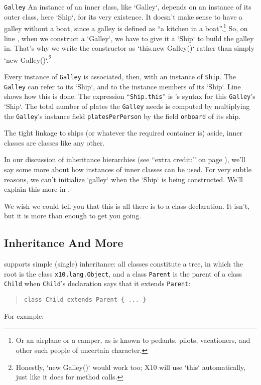\begin{description}
\begin{finepoint} {\tt Galley}
An instance of an inner class, like \xcd`Galley`, depends on an instance of
its outer class, here \xcd`Ship`, for its very existence.  It doesn't make
sense to have a galley without a boat, since a galley is defined as ``a
kitchen in a boat''.\footnote{Or an airplane or a camper, as is known to
pedants, pilots, vacationers, and other such people of uncertain character.}   
So, on line , when we construct a \xcd`Galley`, we
have to give it a \xcd`Ship` to build the galley in. That's why we write the
constructor as \xcd`this.new Galley()` rather than simply 
\xcd`new Galley()`.\footnote{Honestly, \xcd`new Galley()` would work too; X10
will use 
\xcd`this` automatically, just like it does for method calls.}


Every instance of {\tt Galley} is associated, then, with an instance of
{\tt Ship}.  
The {\tt Galley} can refer to its \xcd`Ship`, and to the 
instance members of its \xcd`Ship`.  Line  shows how
this is done. 
The expression ``{\tt Ship.this}'' is \Xten's syntax
for this {\tt Galley}'s \xcd`Ship`. 
The total number of plates the {\tt Galley} needs is computed by
multiplying the {\tt Galley}'s instance field {\tt plates\-Per\-Person} 
by the field {\tt onboard} of its ship. 

The tight linkage to ships (or whatever the required container is) aside,
inner classes are classes like any other.   


In our discussion of inheritance hierarchies (see ``extra credit:''
on page \pageref{ssec:pinc}), we'll say some more
about how instances of inner classes can be used.
For very subtle reasons, we can't initialize \xcd`galley` when the \xcd`Ship`
is being constructed.  We'll explain this more in .  

\end{finepoint}
\end{description}

We wish we could tell you that this is all there is to a class declaration.  It isn't, but it
is more than enough to get you going.

\subsection{Inheritance And More}\label{sec:inh}

\Xten{} supports simple (single) inheritance: all \Xten{} classes constitute a tree, in
which the root is the class {\tt x10.lang.Object}, and a class {\tt Parent} is the
parent of a class {\tt Child} when {\tt Child}'s declaration says  that it
extends {\tt Parent}:
\begin{quote}{\tt class Child extends Parent \{ ... \}}\end{quote}
For example:

